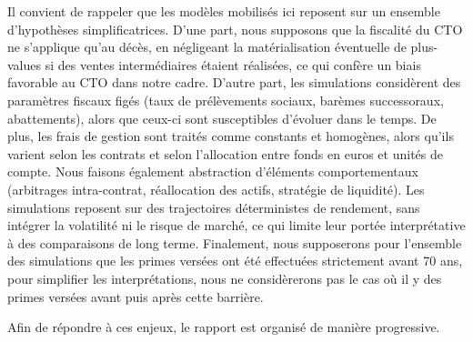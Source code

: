 Il convient de rappeler que les modèles mobilisés ici reposent sur un ensemble d'hypothèses simplificatrices. D'une part, nous supposons que la fiscalité du CTO ne s'applique qu'au décès, en négligeant la matérialisation éventuelle de plus-values si des ventes intermédiaires étaient réalisées, ce qui confère un biais favorable au CTO dans notre cadre. D'autre part, les simulations considèrent des paramètres fiscaux figés (taux de prélèvements sociaux, barèmes successoraux, abattements), alors que ceux-ci sont susceptibles d'évoluer dans le temps. De plus, les frais de gestion sont traités comme constants et homogènes, alors qu'ils varient selon les contrats et selon l'allocation entre fonds en euros et unités de compte. Nous faisons également abstraction d'éléments comportementaux (arbitrages intra-contrat, réallocation des actifs, stratégie de liquidité). Les simulations reposent sur des trajectoires déterministes de rendement, sans intégrer la volatilité ni le risque de marché, ce qui limite leur portée interprétative à des comparaisons de long terme. Finalement, nous supposerons pour l'ensemble des simulations que les primes versées ont été effectuées strictement avant 70 ans, pour simplifier les interprétations, nous ne considèrerons pas le cas où il y des primes versées avant puis après cette barrière.

Afin de répondre à ces enjeux, le rapport est organisé de manière progressive.
